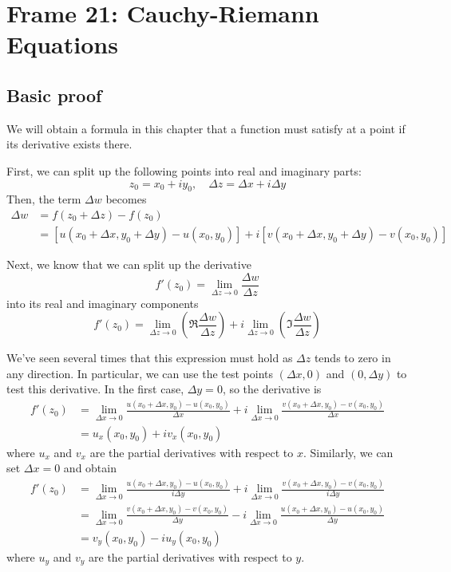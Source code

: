 \documentclass{article}
\begin{document}
\clearpage
\section{Frame 21: Cauchy-Riemann Equations}
\subsection{Basic proof}
We will obtain a formula in this chapter that a function must satisfy at a point if its derivative exists there.

First, we can split up the following points into real and imaginary parts:
\[
	z_0 = x_0 + iy_0,	\quad \Delta z = \Delta x + i \Delta y	
\]
Then, the term $\Delta w$ becomes
\begin{align*}
	\Delta w &= f(z_0 + \Delta z) - f(z_0) \\
	&= [u(x_0 + \Delta x, y_0 + \Delta y) - u(x_0, y_0)]
	+ i[v(x_0 + \Delta x, y_0 + \Delta y) - v(x_0, y_0)]
\end{align*}

Next, we know that we can split up the derivative
\[
	f'(z_0) = \lim_{\Delta z \to 0} \frac{\Delta w}{\Delta z}
\]
into its real and imaginary components
\[
	f'(z_0) = \lim_{\Delta z \to 0} \left( \Re \frac{\Delta w}{\Delta z} \right)
	+ i\lim_{\Delta z \to 0} \left( \Im \frac{\Delta w}{\Delta z} \right)
\]

We've seen several times that this expression must hold as $\Delta z$ tends to zero in any direction. In particular, we can use the test points $(\Delta x, 0)$ and $(0, \Delta y)$ to test this derivative. In the first case, $\Delta y = 0$, so the derivative is
\begin{align*}
	f'(z_0) 
	&= \lim_{\Delta x \to 0} \frac{u(x_0 + \Delta x, y_0) - u(x_0, y_0)}{\Delta x}
	+i \lim_{\Delta x \to 0} \frac{v(x_0 + \Delta x, y_0) - v(x_0, y_0)}{\Delta x} \\
	&= u_x(x_0, y_0) + iv_x(x_0, y_0)
\end{align*}
where $u_x$ and $v_x$ are the partial derivatives with respect to $x$. Similarly, we can set $\Delta x = 0$ and obtain
\begin{align*}
	f'(z_0) 
	&= \lim_{\Delta x \to 0} \frac{u(x_0+ \Delta x,y_0) - u(x_0,y_0)}{i\Delta y}
	+i \lim_{\Delta x \to 0} \frac{v(x_0+ \Delta x,y_0) - v(x_0,y_0)}{i\Delta y} \\
	&= \lim_{\Delta x \to 0} \frac{v(x_0+ \Delta x,y_0) - v(x_0,y_0)}{\Delta y}
	-i \lim_{\Delta x \to 0} \frac{u(x_0+ \Delta x,y_0) - u(x_0,y_0)}{\Delta y}	\\
	&= v_y(x_0, y_0) - iu_y(x_0, y_0)
\end{align*}
where $u_y$ and $v_y$ are the partial derivatives with respect to $y$. 
\end{document}
